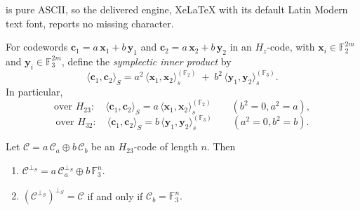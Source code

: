 \documentclass[10pt,a4paper]{amsart}
\def\C{{\mathcal{C}}}
\newcommand{\F}{\mathbb{F}}
\begin{document}
is pure ASCII, so the delivered engine, XeLaTeX with its default Latin Modern text font, reports no missing character.
\begin{remark}\label{rem}
For codewords \(\mathbf{c}_1=a\,\mathbf{x}_1+b\,\mathbf{y}_1\) and \(\mathbf{c}_2=a\,\mathbf{x}_2+b\,\mathbf{y}_2\) in an \(H_z\)-code, with
\(\mathbf{x}_i\in\F_2^{2m}\) and \(\mathbf{y}_i\in\F_3^{2m}\), define the \emph {symplectic inner product} by
\begin{equation}
	\langle \mathbf{c}_1,\mathbf{c}_2\rangle_S
= a^2\,\langle \mathbf{x}_1,\mathbf{x}_2\rangle_s^{(\F_2)}
\;+\;
b^2\,\langle \mathbf{y}_1,\mathbf{y}_2\rangle_s^{(\F_3)}.
\end{equation}
 In particular,
\[
\text{over }H_{23}:\quad \langle \mathbf{c}_1,\mathbf{c}_2\rangle_S
= a\,\langle \mathbf{x}_1,\mathbf{x}_2\rangle_s^{(\F_2)}
\qquad(b^2=0,a^2=a),
\]
\[
\text{over }H_{32}:\quad \langle \mathbf{c}_1,\mathbf{c}_2\rangle_S
= b\,\langle \mathbf{y}_1,\mathbf{y}_2\rangle_s^{(\F_3)}
\qquad(a^2=0,b^2=b).
\]
\end{remark}

\begin{theorem}\label{thmdualH23} 
Let $\C=a\, \C_a \oplus b\, \C_b$ be an $H_{23}$-code of length $n$. Then

\begin{enumerate}
\item  $\C^{\perp_S} = a \, \C_a^{\perp_S}  \oplus b \, \mathbb{F}_3^{n}$.
\item $(\C^{\perp_S})^{\perp_S}=\C$ if and only if $\C_b=\mathbb{F}_3^{n}.$

\end{enumerate}

\end{theorem}
\end{document}

